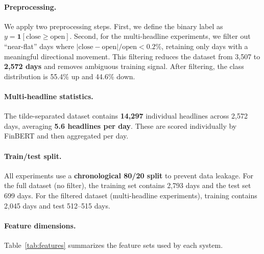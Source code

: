 \documentclass[11pt]{article}
\begin{document}
\paragraph{Preprocessing.} We apply two preprocessing steps. First, we define the binary label as $y = \mathbf{1}[\text{close} \geq \text{open}]$. Second, for the multi-headline experiments, we filter out ``near-flat'' days where $|\text{close}-\text{open}|/\text{open} < 0.2\%$, retaining only days with a meaningful directional movement. This filtering reduces the dataset from 3,507 to \textbf{2,572 days} and removes ambiguous training signal. After filtering, the class distribution is 55.4\% up and 44.6\% down.

\paragraph{Multi-headline statistics.} The tilde-separated dataset contains \textbf{14,297} individual headlines across 2,572 days, averaging \textbf{5.6 headlines per day}. These are scored individually by FinBERT and then aggregated per day.

\paragraph{Train/test split.} All experiments use a \textbf{chronological 80/20 split} to prevent data leakage. For the full dataset (no filter), the training set contains 2,793 days and the test set 699 days. For the filtered dataset (multi-headline experiments), training contains 2,045 days and test 512--515 days.

\paragraph{Feature dimensions.} Table~\ref{tab:features} summarizes the feature sets used by each system.
\end{document}
